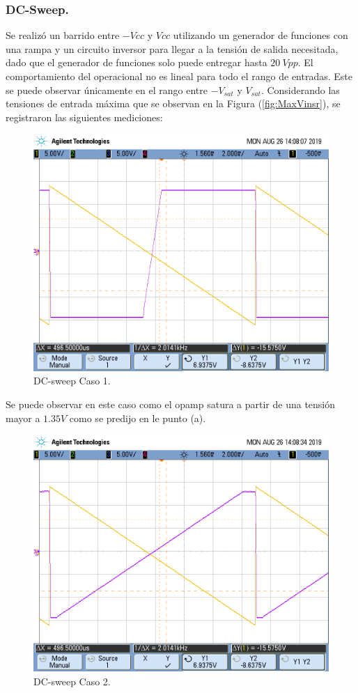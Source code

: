 \subsubsection{DC-Sweep.}
Se realizó un barrido entre $-Vcc$ y $Vcc$ utilizando un generador de funciones con una rampa y un circuito inversor para llegar a la tensión de salida necesitada, dado que el generador de funciones solo puede entregar hasta $20 \ Vpp$.
El comportamiento del operacional no es lineal para todo el rango de entradas. Este se puede observar únicamente en el rango entre $-V_{sat}$ y $V_{sat}$. Considerando las tensiones de entrada máxima que se observan en la Figura (\ref{fig:MaxVinsr}), se registraron las siguientes mediciones:
\begin{figure}[H]	
	\centering
	\includegraphics[width=\textwidth]{Ejercicio1/Imagenes/dc_sweep_c1.png}
	\caption{DC-sweep Caso 1.}
	\label{fig:dcc1}
\end{figure} 
Se puede observar en este caso como el opamp satura a partir de una tensión mayor a $1.35 V$ como se predijo en le punto (a).
\begin{figure}[H]	
	\centering
	\includegraphics[width=\textwidth]{Ejercicio1/Imagenes/dc_sweep_c2.png}
	\caption{DC-sweep Caso 2.}
	\label{fig:dcc2}
\end{figure} 
